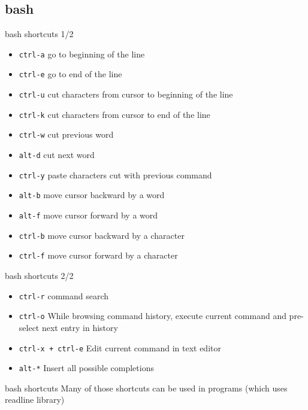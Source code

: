 \subsection{bash}

\begin{frame}[fragile]{bash shortcuts 1/2}
  \begin{itemize}
    \pause \item \texttt{ctrl-a} go to beginning of the line
    \pause \item \texttt{ctrl-e} go to end of the line
    \pause \item \texttt{ctrl-u} cut characters from cursor to beginning of the line
    \pause \item \texttt{ctrl-k} cut characters from cursor to end of the line
    \pause \item \texttt{ctrl-w} cut previous word
    \pause \item \texttt{alt-d} cut next word
    \pause \item \texttt{ctrl-y} paste characters cut with previous command
    \pause \item \texttt{alt-b} move cursor backward by a word
    \pause \item \texttt{alt-f} move cursor forward by a word
    \pause \item \texttt{ctrl-b} move cursor backward by a character
    \pause \item \texttt{ctrl-f} move cursor forward by a character
  \end{itemize}
\end{frame}

\begin{frame}[fragile]{bash shortcuts 2/2}
  \begin{itemize}
    \item \texttt{ctrl-r} command search
    \pause \item \texttt{ctrl-o} While browsing command history, execute current command and pre-select next entry in history
    \pause \item \texttt{ctrl-x + ctrl-e} Edit current command in text editor
    \pause \item \texttt{alt-*} Insert all possible completions
  \end{itemize}
\end{frame}

\begin{frame}[fragile]{bash shortcuts}
Many of those shortcuts can be used in programs (which uses readline library)
\end{frame}

